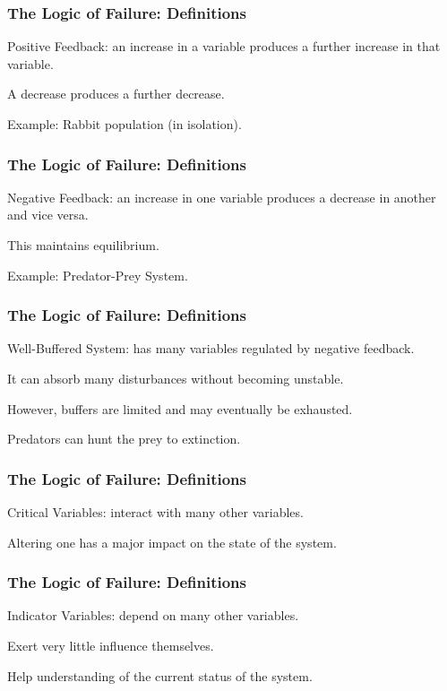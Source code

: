 \begin{frame}
\frametitle{The Logic of Failure: Definitions}
\begin{changemargin}{1cm}
\alert{Positive Feedback}: an increase in a variable produces a further increase in that variable.

A decrease produces a further decrease.

Example: Rabbit population (in isolation).

\end{changemargin}
\end{frame}

\begin{frame}
\frametitle{The Logic of Failure: Definitions}
\begin{changemargin}{1cm}
\alert{Negative Feedback}: an increase in one variable produces a decrease in another and vice versa.

This maintains equilibrium.

Example: Predator-Prey System.

\end{changemargin}
\end{frame}

\begin{frame}
\frametitle{The Logic of Failure: Definitions}
\begin{changemargin}{1cm}
\alert{Well-Buffered System}: has many variables regulated by negative feedback.

It can absorb many disturbances without becoming unstable. 

However, buffers are limited and may eventually be exhausted. 

Predators can hunt the prey to extinction.

\end{changemargin}
\end{frame}

\begin{frame}
\frametitle{The Logic of Failure: Definitions}
\begin{changemargin}{1cm}
\alert{Critical Variables}: interact with many other variables.

Altering one has a major impact on the state of the system.

\end{changemargin}
\end{frame}

\begin{frame}
\frametitle{The Logic of Failure: Definitions}
\begin{changemargin}{1cm}
\alert{Indicator Variables}: depend on many other variables.

Exert very little influence themselves.

Help understanding of the current status of the system. 

\end{changemargin}
\end{frame}


